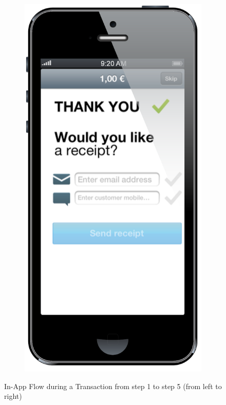 \documentclass[a4paper, oneside]{csthesis}
\begin{document}
\begin{figure}
\begin{subfigure}[b]{0.16\textwidth}
                \includegraphics[width=\textwidth]{figures/flow6.png}
                \label{fig:flow6}
        \end{subfigure}
        \caption{In-App Flow during a Transaction from step 1 to step 5 (from left to right)}\label{fig:flow-customer}
\end{figure}
\end{document}
